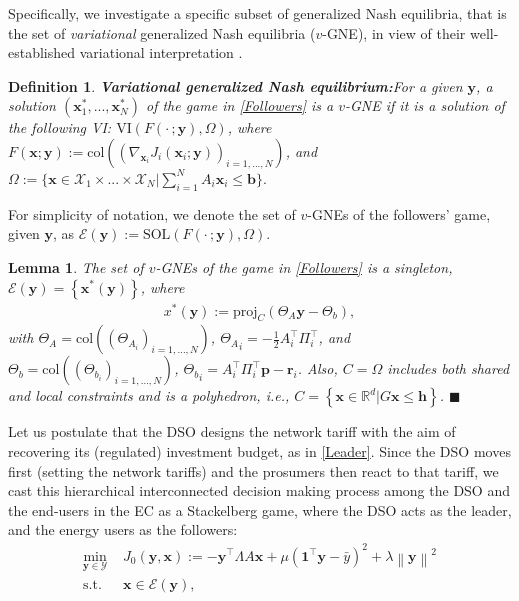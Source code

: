 \documentclass[letterpaper, 10 pt, conference]{ieeeconf}
\newcommand{\real}{\mathbb{R}}
\newcommand\bbf{\mathbf{b}}
\newcommand\pbf{\mathbf{p}}
\newcommand\rbf{\mathbf{r}}
\newcommand\xbf{\mathbf{x}}
\newcommand\ybf{\mathbf{y}}
\newtheorem{lemma}{Lemma}
\newtheorem{definition}{Definition}
\begin{document}
Specifically, we investigate a specific subset of generalized Nash equilibria, that is the set of \emph{variational} generalized Nash equilibria ($v$-GNE), in view of their well-established variational interpretation \cite{facchinei2003finite}.
\begin{definition}{\textbf{Variational generalized Nash equilibrium:}}\label{vGNE}
For a given $\ybf$, a solution $\left(\xbf^*_1, ..., \xbf^*_N\right)$ of the game in \eqref{Followers} is a $v$-GNE if it is a solution of the following VI: $\mathrm{VI}(F(\cdot \, ;\ybf), \Omega)$, where $F(\xbf;\ybf):=\mathrm{col}\left((\nabla_{\xbf_i} J_i(\xbf_i; \ybf))_{i =1,...,N}\right)$, and $\Omega:=\{\xbf \in \mathcal{X}_1\times... \times \mathcal{X}_N| \sum_{i=1}^N A_i\xbf_i \le \bbf\}.$
\end{definition}
For simplicity of notation, we denote the set of $v$-GNEs of the followers' game, given $\ybf$, as $\mathcal{E}(\ybf):=\mathrm{SOL}(F(\cdot\,;\ybf),\Omega)$. 
\begin{lemma}\label{lemma1}
    The set of $v$-GNEs of the game in \eqref{Followers} is a singleton, $\mathcal{E}(\ybf)=\left\{\xbf^*(\ybf)\right\}$, where
    \begin{align}\label{proj}
        x^*(\ybf):=\mathrm{proj}_C(\Theta_A\ybf-\Theta_b),
    \end{align}
    with $\Theta_A=\mathrm{col}\left((\Theta_{A_i})_{i=1,\dots,N}\right)$, ${\Theta_A}_i=-\frac{1}{2} A_i^\top\Pi_i^\top$, and $\Theta_b=\mathrm{col}\left((\Theta_{b_i})_{i=1,\dots,N}\right)$, ${\Theta_b}_i=A_i^\top \Pi_i^\top\pbf - \rbf_i$. Also, $C=\Omega$ includes both shared and local constraints and is a polyhedron, i.e., $C=\left\{\xbf \in \real^d | G \xbf \le \mathbf{h}\right\}$.  \hfill $\blacksquare$
\end{lemma} 
 Let us postulate that the DSO designs the network tariff with the aim of recovering its (regulated) investment budget, as in \eqref{Leader}. Since the DSO moves first (setting the network tariffs) and the prosumers then react to that tariff, we cast this hierarchical interconnected decision making process among the DSO and the end-users in the EC as a Stackelberg game, where the DSO acts as the leader, and the energy users as the followers:
\begin{subequations}\label{Stackelberg}
\begin{align}
\underset{\ybf \in \mathcal{Y}} {\min} \, \,&J_0(\ybf,\xbf):=-\ybf^\top \Lambda A \xbf+ \mu \left(\mathbf{1}^\top\ybf-\bar{y}\right)^2+\lambda\left\|\ybf\right\|^2\label{Leader}
\\
\mathrm{s. t.}\,&  \xbf \in \mathcal{E}(\ybf), \label{LeaderConstr}
\end{align}
\end{subequations}
\end{document}
